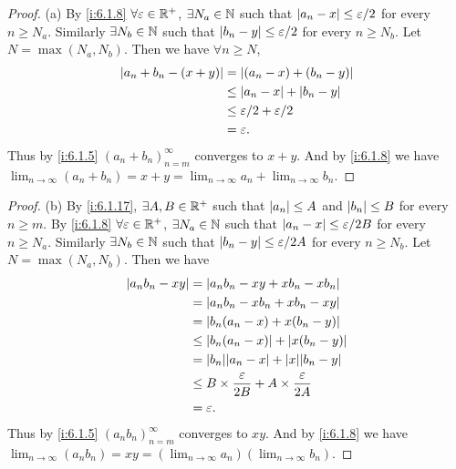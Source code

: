 \begin{proof}{(a)}
  By \cref{i:6.1.8} \(\forall \varepsilon \in \mathbb{R}^+\), \(\exists N_a \in \mathbb{N}\) such that \(\left\lvert a_n - x\right\rvert \leq \varepsilon / 2\) for every \(n \geq N_a\).
  Similarly \(\exists N_b \in \mathbb{N}\) such that \(\left\lvert b_n - y\right\rvert \leq \varepsilon / 2\) for every \(n \geq N_b\).
  Let \(N = \max(N_a, N_b)\).
  Then we have \(\forall n \geq N\),
  \begin{align*}
    \left\lvert a_n + b_n - (x + y)\right\rvert & = \left\lvert(a_n - x) + (b_n - y)\right\rvert          \\
                              & \leq \left\lvert a_n - x\right\rvert + \left\lvert b_n - y\right\rvert     \\
                              & \leq \varepsilon / 2 + \varepsilon / 2 \\
                              & = \varepsilon.
  \end{align*}
  Thus by \cref{i:6.1.5} \((a_n + b_n)_{n = m}^\infty\) converges to \(x + y\).
  And by \cref{i:6.1.8} we have \(\lim_{n \to \infty} (a_n + b_n) = x + y = \lim_{n \to \infty} a_n + \lim_{n \to \infty} b_n\).
\end{proof}

\begin{proof}{(b)}
  By \cref{i:6.1.17}, \(\exists A, B \in \mathbb{R}^+\) such that \(\left\lvert a_n\right\rvert \leq A\) and \(\left\lvert b_n\right\rvert \leq B\) for every \(n \geq m\).
  By \cref{i:6.1.8} \(\forall \varepsilon \in \mathbb{R}^+\), \(\exists N_a \in \mathbb{N}\) such that \(\left\lvert a_n - x\right\rvert \leq \varepsilon / 2B\) for every \(n \geq N_a\).
  Similarly \(\exists N_b \in \mathbb{N}\) such that \(\left\lvert b_n - y\right\rvert \leq \varepsilon / 2A\) for every \(n \geq N_b\).
  Let \(N = \max(N_a, N_b)\).
  Then we have
  \begin{align*}
    \abs{a_n b_n - x y} & = \abs{a_n b_n - x y + x b_n - x b_n}                                    \\
                        & = \abs{a_n b_n - x b_n + x b_n - x y}                                    \\
                        & = \abs{b_n(a_n - x) + x(b_n - y)}                                        \\
                        & \leq \abs{b_n(a_n - x)} + \abs{x(b_n - y)}                               \\
                        & = \abs{b_n}\abs{a_n - x} + \abs{x}\abs{b_n - y}                          \\
                        & \leq B \times \dfrac{\varepsilon}{2B} + A \times \dfrac{\varepsilon}{2A} \\
                        & = \varepsilon.
  \end{align*}
  Thus by \cref{i:6.1.5} \((a_n b_n)_{n = m}^\infty\) converges to \(x y\).
  And by \cref{i:6.1.8} we have \(\lim_{n \to \infty} (a_n b_n) = x y = (\lim_{n \to \infty} a_n)(\lim_{n \to \infty} b_n)\).
\end{proof}

